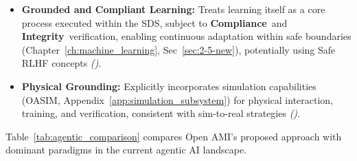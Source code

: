 \documentclass[12pt,a4paper]{report}
\renewcommand{\citep}[1]{\textit{\scriptsize{(\cite{#1})}}}
\newcommand{\Compliance}{\textbf{Compliance}}
\newcommand{\Integrity}{\textbf{Integrity}}
\begin{document}
\begin{itemize}[noitemsep]
		\newline
		\item \textbf{Grounded and Compliant Learning:} Treats learning itself as a core process executed within the SDS, subject to \Compliance\ and \Integrity\ verification, enabling continuous adaptation within safe boundaries (Chapter~\ref{ch:machine_learning}, Sec~\ref{sec:2-5-new}), potentially using Safe RLHF concepts \citep{Dai_Safe_RLHF_2023}.
		\newline
		\item \textbf{Physical Grounding:} Explicitly incorporates simulation capabilities (OASIM, Appendix~\ref{app:simulation_subsystem}) for physical interaction, training, and verification, consistent with sim-to-real strategies \citep{Josifovski_SCDA_2025, Berg2025DigitalTwin}.
	\end{itemize}
	
	Table~\ref{tab:agentic_comparison} compares Open AMI's proposed approach with dominant paradigms in the current agentic AI landscape.
	
\end{document}

